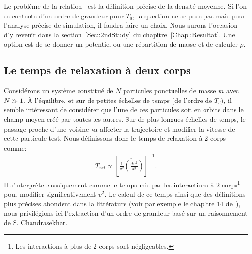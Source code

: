Le problème de la relation~ est la définition précise de la densité moyenne. Si l'on se contente d'un ordre de grandeur pour $T_d$,
la question ne se pose pas mais pour l'analyse précise de simulation, il faudra faire un choix. Nous aurons l'occasion d'y revenir dans la
section~\ref{Sec::2ndStudy} du chapitre~\ref{Chap::Resultat}.
Une option est de se donner un potentiel ou une répartition de masse et de calculer $\bar{\rho}$. %





\subsection{Le temps de relaxation à deux corps}

Considérons un système constitué de $N$ particules ponctuelles de masse $m$ avec $N\gg1$. À l'équilibre, et sur de petites échelles de temps (de
l'ordre de $T_{d})$, il semble intéressant de considérer que l'une de ces particules soit en orbite dans le champ moyen créé par toutes les autres. Sur
de plus longues échelles de temps, le passage proche d'une voisine va affecter la trajectoire et modifier la vitesse de cette
particule test. Nous définissons donc le temps de relaxation à 2 corps comme:
\begin{align}
	T_{rel}\propto\left[  \overline{\frac{1}{v^{2}}\left(  \frac{dv^{2}}{dt}\right)  }\right]  ^{-1}. \label{TREL}%
\end{align}
Il s'interprète classiquement comme le temps mis par les interactions à 2 corps\footnote{Les interactions à plus de 2 corps sont négligeables.} pour modifier significativement
$v^{2}$. Le calcul de ce temps ainsi que des définitions plus précises abondent dans la littérature (voir par exemple le chapitre 14 de\ \cite{HH}),
nous privilégions ici l'extraction d'un ordre de grandeur basé sur un raisonnement de S. Chandrasekhar.

